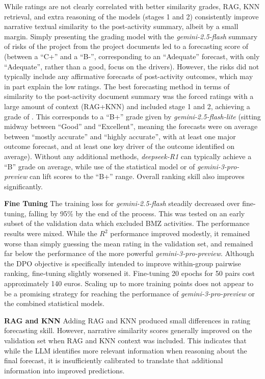 \documentclass[12pt,a4paper]{article}
\begin{document}
While ratings are not clearly correlated with better similarity grades, RAG, KNN retrieval, and extra reasoning of the models (stages 1 and 2) consistently improve narrative textual similarity to the post-activity summary, albeit by a small margin. Simply presenting the grading model with the \emph{gemini-2.5-flash} summary of risks of the project from the project documents led to a forecasting score of \RisksOnlyGrade{} (between a ``C+'' and a ``B-'', corresponding to an ``Adequate'' forecast, with only ``Adequate'', rather than a good, focus on the drivers). However, the risks did not typically include any affirmative forecasts of post-activity outcomes, which may in part explain the low ratings. The best forecasting method in terms of similarity to the post-activity document summary was the forced ratings with a large amount of context (RAG+KNN) and included stage 1 and 2, achieving a grade of \BestNarrativeGrade{}. This corresponds to a ``B+'' grade given by \emph{gemini-2.5-flash-lite} (sitting midway between ``Good'' and ``Excellent'', meaning the forecasts were on average between ``mostly accurate'' and ``highly accurate'', with at least one major outcome forecast, and at least one key driver of the outcome identified on average). Without any additional methods, \emph{deepseek-R1} can typically achieve a ``B'' grade on average, while use of the statistical model or of \emph{gemini-3-pro-preview} can lift scores to the ``B+'' range. Overall ranking skill also improves significantly.

\textbf{Fine Tuning}
The training loss for \emph{gemini-2.5-flash} steadily decreased over fine-tuning, falling by 95\% by the end of the process. This was tested on an early subset of the validation data which excluded BMZ activities. The performance results were mixed. While the $R^2$ performance improved modestly, it remained worse than simply guessing the mean rating in the validation set, and remained far below the performance of the more powerful \emph{gemini-3-pro-preview}. Although the DPO objective is specifically intended to improve within-group pairwise ranking, fine-tuning slightly worsened it. Fine-tuning 20 epochs for 50 pairs cost approximately 140 euros. Scaling up to more training points does not appear to be a promising strategy for reaching the performance of \emph{gemini-3-pro-preview} or the combined statistical models.

\textbf{RAG and KNN}
Adding RAG and KNN produced small differences in rating forecasting skill. However, narrative similarity scores generally improved on the validation set when RAG and KNN context was included. This indicates that while the LLM identifies more relevant information when reasoning about the final forecast, it is insufficiently calibrated to translate that additional information into improved predictions.
\end{document}
